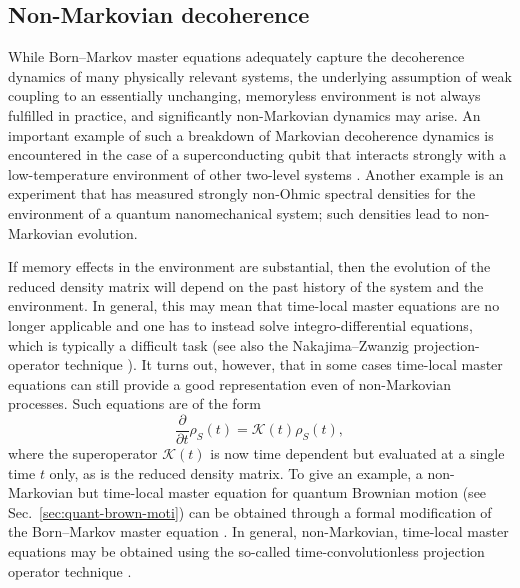 \documentclass[3p,sort&compress]{elsarticle}
\newcommand{\op}[1]{#1}
\begin{document}
\subsection{\label{sec:non-mark-decoh}Non-Markovian decoherence}

While Born--Markov master equations adequately capture the decoherence dynamics of many physically relevant systems, the underlying assumption of weak coupling to an essentially unchanging, memoryless environment is not always fulfilled in practice, and significantly non-Markovian dynamics may arise. An important example of such a breakdown of Markovian decoherence dynamics is encountered in the case of a superconducting qubit that interacts strongly with a low-temperature environment of other two-level systems \cite{Prokofev:2000:zz,Dube:2001:zz}. Another example is an experiment \cite{Groeblacher:2013:im} that has measured strongly non-Ohmic spectral densities for the environment of a quantum nanomechanical system; such densities lead to non-Markovian evolution. 

If memory effects in the environment are substantial, then the evolution of the reduced density matrix will depend on the past history of the system and the environment. In general, this may mean that time-local master equations are no longer  applicable and one has to instead solve integro-differential equations, which is typically a difficult task (see also the Nakajima--Zwanzig projection-operator technique
\cite{Nakajima:1958:im,Zwanzig:1960:om,Zwanzig:1960:mo,Joos:2003:jh}). It turns out, however, that in some cases time-local master equations can still provide a good representation even of non-Markovian processes. Such equations are  of the form
%
\begin{equation}
\label{eq:sfihvsfhv7}
  \frac{\partial}{\partial t} \op{\rho}_S(t) = \mathcal{K}(t) \op{\rho}_S(t),
\end{equation}
%
where the superoperator $\mathcal{K}(t)$ is now time dependent but evaluated at a single time $t$ only, as is the reduced density matrix. To give an example, a non-Markovian but time-local master equation  for quantum Brownian motion (see Sec.~\ref{sec:quant-brown-moti}) can be obtained through a formal modification of the Born--Markov master equation \cite{Paz:2001:aa,Zurek:2002:ii}. In general, non-Markovian, time-local master equations may be obtained using the so-called time-convolutionless projection operator technique \cite{Chaturvedi:1979:pm,Shibata:1980:ma,Royer:1972:um,Royer:2003:za}. 
\end{document}
